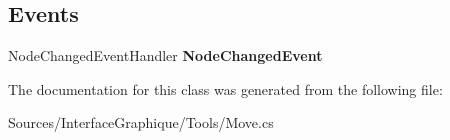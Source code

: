 \subsection*{Events}
\begin{DoxyCompactItemize}
\item 
\hypertarget{class_interface_graphique_1_1_tools_1_1_move_a058bd0ebedbf308c53ef687bf07d8095}{}Node\+Changed\+Event\+Handler {\bfseries Node\+Changed\+Event}\label{class_interface_graphique_1_1_tools_1_1_move_a058bd0ebedbf308c53ef687bf07d8095}

\end{DoxyCompactItemize}


The documentation for this class was generated from the following file\+:\begin{DoxyCompactItemize}
\item 
Sources/\+Interface\+Graphique/\+Tools/Move.\+cs\end{DoxyCompactItemize}

